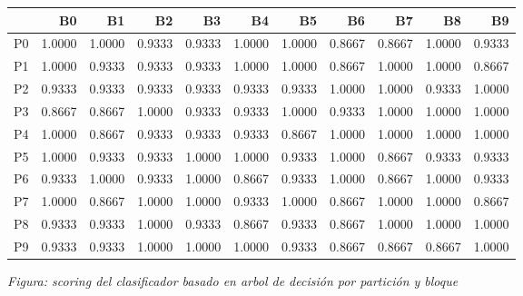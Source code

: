 \documentclass[11pt]{article}
\begin{document}
            \begin{mdframed}[hidealllines=true,backgroundcolor=green!10]
            
    
    \begin{tabular}{lrrrrrrrrrr}
\toprule
{} &      B0 &      B1 &      B2 &      B3 &      B4 &      B5 &      B6 &      B7 &      B8 &      B9 \\
\midrule
P0 &  1.0000 &  1.0000 &  0.9333 &  0.9333 &  1.0000 &  1.0000 &  0.8667 &  0.8667 &  1.0000 &  0.9333 \\
P1 &  1.0000 &  0.9333 &  0.9333 &  0.9333 &  1.0000 &  1.0000 &  0.8667 &  1.0000 &  1.0000 &  0.8667 \\
P2 &  0.9333 &  0.9333 &  0.9333 &  0.9333 &  0.9333 &  0.9333 &  1.0000 &  1.0000 &  0.9333 &  1.0000 \\
P3 &  0.8667 &  0.8667 &  1.0000 &  0.9333 &  0.9333 &  1.0000 &  0.9333 &  1.0000 &  1.0000 &  1.0000 \\
P4 &  1.0000 &  0.8667 &  0.9333 &  0.9333 &  0.9333 &  0.8667 &  1.0000 &  1.0000 &  1.0000 &  1.0000 \\
P5 &  1.0000 &  0.9333 &  0.9333 &  1.0000 &  1.0000 &  0.9333 &  1.0000 &  0.8667 &  0.9333 &  0.9333 \\
P6 &  0.9333 &  1.0000 &  0.9333 &  1.0000 &  0.8667 &  0.9333 &  1.0000 &  0.8667 &  1.0000 &  0.9333 \\
P7 &  1.0000 &  0.8667 &  1.0000 &  1.0000 &  0.9333 &  1.0000 &  0.8667 &  1.0000 &  1.0000 &  0.8667 \\
P8 &  0.9333 &  0.9333 &  1.0000 &  0.9333 &  0.8667 &  0.9333 &  0.8667 &  1.0000 &  1.0000 &  1.0000 \\
P9 &  0.9333 &  0.9333 &  1.0000 &  1.0000 &  1.0000 &  0.9333 &  0.8667 &  0.8667 &  0.8667 &  1.0000 \\
\bottomrule
\end{tabular}

    

            \end{mdframed}
            \endgroup
    \emph{Figura: scoring del clasificador basado en arbol de decisión por
partición y bloque}
\end{document}
